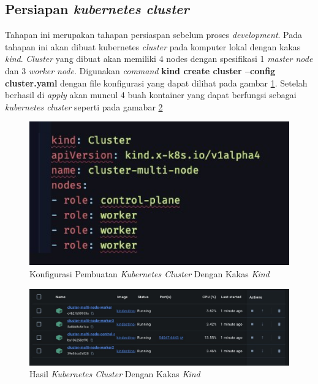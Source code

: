 \subsection{Persiapan \textit{kubernetes cluster}}
\label{subsec:persiapan-kubernetes-cluster}

Tahapan ini merupakan tahapan persiaspan sebelum proses \textit{development}. Pada tahapan ini akan dibuat kubernetes \textit{cluster} pada komputer lokal dengan kakas \textit{kind}. \textit{Cluster} yang dibuat akan memiliki 4 nodes dengan spesifikasi 1 \textit{master node} dan 3 \textit{worker node}. Digunakan \textit{command} \textbf{kind create cluster --config cluster.yaml} dengan file konfigurasi yang dapat dilihat pada gambar \ref{fig:konfigurasi-pembuatan-cluster}. Setelah berhasil di \textit{apply} akan muncul 4 buah kontainer yang dapat berfungsi sebagai \textit{kubernetes cluster} seperti pada gamabar \ref{fig:hasil-cluster-kind}

\begin{figure}[ht]
  \centering
  \includegraphics[width=1\textwidth]{resources/appendix/pembuatan-cluster.jpg}
  \caption{Konfigurasi Pembuatan \textit{Kubernetes Cluster} Dengan Kakas \textit{Kind}}
  \label{fig:konfigurasi-pembuatan-cluster}
\end{figure}

\begin{figure}[ht]
  \centering
  \includegraphics[width=1\textwidth]{resources/chapter-4/cluster-kind.jpg}
  \caption{Hasil \textit{Kubernetes Cluster} Dengan Kakas \textit{Kind}}
  \label{fig:hasil-cluster-kind}
\end{figure}

\pagebreak